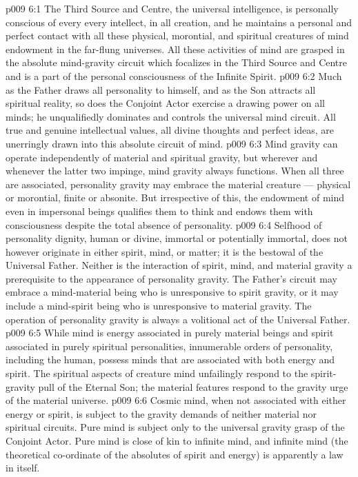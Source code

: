 \vs p009 6:1 The Third Source and Centre, the universal intelligence, is personally conscious of every  every intellect, in all creation, and he maintains a personal and perfect contact with all these physical, morontial, and spiritual creatures of mind endowment in the far\hyp{}flung universes. All these activities of mind are grasped in the absolute mind\hyp{}gravity circuit which focalizes in the Third Source and Centre and is a part of the personal consciousness of the Infinite Spirit.
\vs p009 6:2 Much as the Father draws all personality to himself, and as the Son attracts all spiritual reality, so does the Conjoint Actor exercise a drawing power on all minds; he unqualifiedly dominates and controls the universal mind circuit. All true and genuine intellectual values, all divine thoughts and perfect ideas, are unerringly drawn into this absolute circuit of mind.
\vs p009 6:3 \pc Mind gravity can operate independently of material and spiritual gravity, but wherever and whenever the latter two impinge, mind gravity always functions. When all three are associated, personality gravity may embrace the material creature --- physical or morontial, finite or absonite. But irrespective of this, the endowment of mind even in impersonal beings qualifies them to think and endows them with consciousness despite the total absence of personality.
\vs p009 6:4 \pc Selfhood of personality dignity, human or divine, immortal or potentially immortal, does not however originate in either spirit, mind, or matter; it is the bestowal of the Universal Father. Neither is the interaction of spirit, mind, and material gravity a prerequisite to the appearance of personality gravity. The Father’s circuit may embrace a mind\hyp{}material being who is unresponsive to spirit gravity, or it may include a mind\hyp{}spirit being who is unresponsive to material gravity. The operation of personality gravity is always a volitional act of the Universal Father.
\vs p009 6:5 While mind is energy associated in purely material beings and spirit associated in purely spiritual personalities, innumerable orders of personality, including the human, possess minds that are associated with both energy and spirit. The spiritual aspects of creature mind unfailingly respond to the spirit\hyp{}gravity pull of the Eternal Son; the material features respond to the gravity urge of the material universe.
\vs p009 6:6 \pc Cosmic mind, when not associated with either energy or spirit, is subject to the gravity demands of neither material nor spiritual circuits. Pure mind is subject only to the universal gravity grasp of the Conjoint Actor. Pure mind is close of kin to infinite mind, and infinite mind (the theoretical co\hyp{}ordinate of the absolutes of spirit and energy) is apparently a law in itself.

